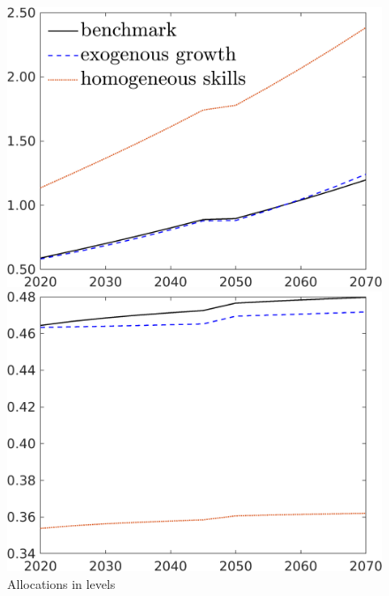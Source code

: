  \begin{figure}[h!!]
	\centering
	\caption{Allocations in levels}\label{fig:comp_mod_allo_lev}
	\begin{minipage}[]{0.32\textwidth}
		\includegraphics[width=1\textwidth]{../../codding_model/own_basedOnFried/optimalPol_190722_tidiedUp/figures/all_10Aout22/CompMod1_OPT_T_NoTaus_C_regime3_spillover0_noskill0_sep1_xgrowth0_extern0_etaa0.79_lgd1.png}
	\end{minipage}
	\begin{minipage}[]{0.32\textwidth}
		\includegraphics[width=1\textwidth]{../../codding_model/own_basedOnFried/optimalPol_190722_tidiedUp/figures/all_10Aout22/CompMod1_OPT_T_NoTaus_hh_regime3_spillover0_noskill0_sep1_xgrowth0_extern0_etaa0.79_lgd0.png}

\end{minipage}
\end{figure}
